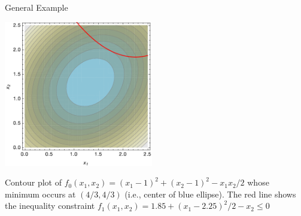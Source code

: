 \documentclass[10pt,english,aspectratio=169]{beamer}
\begin{document}
\begin{frame}{General Example}

\vspace{-2mm}

  \begin{center}
    \includegraphics[width=65mm]{opt_fig}
  \end{center}

\vspace{-2mm}

Contour plot of $f_0 (x_1,x_2) = (x_1 - 1)^2 + (x_2 - 1)^2 - x_1 x_2 /2$ whose minimum occurs at $(4/3,4/3)$ (i.e., center of blue ellipse).  The red line shows the inequality constraint $f_1 (x_1,x_2)= 1.85 + (x_1 - 2.25)^2 / 2 - x_2 \leq 0$

\end{frame}
\end{document}
